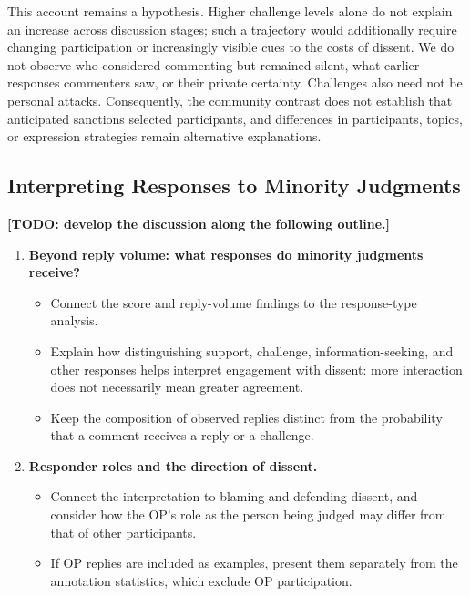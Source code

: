 This account remains a hypothesis. Higher challenge levels alone do not explain an increase across discussion stages; such a trajectory would additionally require changing participation or increasingly visible cues to the costs of dissent. We do not observe who considered commenting but remained silent, what earlier responses commenters saw, or their private certainty. Challenges also need not be personal attacks. Consequently, the community contrast does not establish that anticipated sanctions selected participants, and differences in participants, topics, or expression strategies remain alternative explanations.

\subsection{Interpreting Responses to Minority Judgments}
\label{subsec:discussion-minority-responses}

\textbf{[TODO: develop the discussion along the following outline.]}
\begin{enumerate}
    \item \textbf{Beyond reply volume: what responses do minority judgments receive?}
    \begin{itemize}
        \item Connect the score and reply-volume findings to the response-type analysis.
        \item Explain how distinguishing support, challenge, information-seeking, and
    other responses helps interpret engagement with dissent: more interaction
    does not necessarily mean greater agreement.
        \item Keep the composition of observed replies distinct from the probability that a comment receives
    a reply or a challenge.
    \end{itemize}

    \item \textbf{Responder roles and the direction of dissent.}
    \begin{itemize}
        \item Connect the interpretation to blaming and defending dissent, and consider
    how the OP's role as the person being judged may differ from that of other
    participants.
        \item If OP replies are included as examples, present them separately from the
    annotation statistics, which exclude OP participation.
    \end{itemize}
\end{enumerate}
